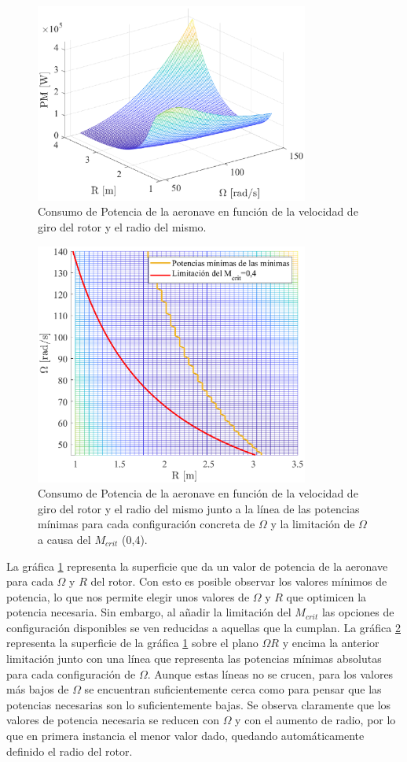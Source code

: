 \begin{figure}
	\centering
	\includegraphics[width=90mm]{graficos/3d3d}
	\caption{Consumo de Potencia de la aeronave en función de la velocidad de giro del rotor y el radio del mismo.}
	\label{ORP}
\end{figure}
\begin{figure}
	\centering
	\includegraphics[width=90mm]{graficos/3d2d}
	\caption{Consumo de Potencia de la aeronave en función de la velocidad de giro del rotor y el radio del mismo junto a la línea de las potencias mínimas para cada configuración concreta de $\Omega$ y la limitación de $\Omega$ a causa del $M_{crit}$ (0,4).}
	\label{ORPM}
\end{figure}

La gráfica \ref{ORP} representa la superficie que da un valor de potencia de la aeronave para cada $\Omega$ y $R$ del rotor. Con esto es posible observar los valores mínimos de potencia, lo que nos permite elegir unos valores de $\Omega$ y $R$ que optimicen la potencia necesaria.
Sin embargo, al añadir la limitación del $M_{crit}$ las opciones de configuración disponibles se ven reducidas a aquellas que la cumplan. La gráfica \ref{ORPM} representa la superficie de la gráfica \ref{ORP} sobre el plano $\Omega R$ y encima la anterior limitación junto con una línea que representa las potencias mínimas absolutas para cada configuración de $\Omega$. Aunque estas líneas no se crucen, para los valores más bajos de $\Omega$ se encuentran suficientemente cerca como para pensar que las potencias necesarias son lo suficientemente bajas.
Se observa claramente que los valores de potencia necesaria se reducen con $\Omega$ y con el aumento de radio, por lo que en primera instancia el menor valor dado, quedando automáticamente definido el radio del rotor.

